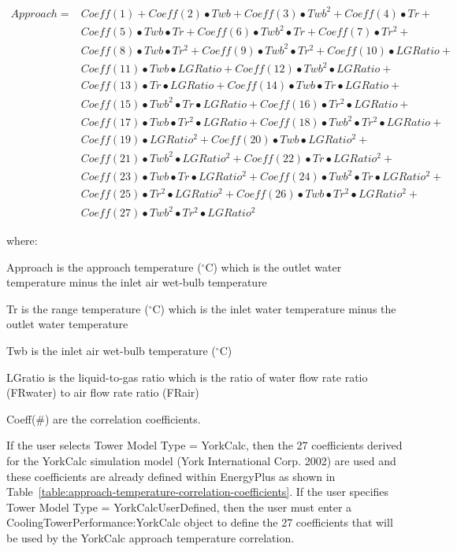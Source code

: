 \begin{equation}
\begin{array}{rl}
Approach =& Coeff(1) + Coeff(2)•Twb + Coeff(3)•Twb^{2} + Coeff(4)•Tr + \\
 & Coeff(5)•Twb•Tr + Coeff(6)•Twb^{2}•Tr + Coeff(7)•Tr^{2} + \\
 & Coeff(8)•Twb•Tr^{2} + Coeff(9)•Twb^{2}•Tr^{2} + Coeff(10)•LGRatio + \\
 & Coeff(11)•Twb•LGRatio + Coeff(12)•Twb^{2}•LGRatio + \\
 & Coeff(13)•Tr•LGRatio + Coeff(14)•Twb•Tr•LGRatio + \\
 & Coeff(15)•Twb^{2}•Tr•LGRatio + Coeff(16)•Tr^{2}•LGRatio + \\
 & Coeff(17)•Twb•Tr^{2}•LGRatio + Coeff(18)•Twb^{2}•Tr^{2}•LGRatio + \\
 & Coeff(19)•LGRatio^{2} + Coeff(20)•Twb•LGRatio^{2} + \\
 & Coeff(21)• Twb^{2}•LGRatio^{2} + Coeff(22)•Tr•LGRatio^{2} + \\
 & Coeff(23)•Twb•Tr•LGRatio^{2} + Coeff(24)•Twb^{2}•Tr•LGRatio^{2} + \\
 & Coeff(25)•Tr^{2}•LGRatio^{2} + Coeff(26)•Twb•Tr^{2}•LGRatio^{2} + \\
 & Coeff(27)•Twb^{2}•Tr^{2}•LGRatio^{2}
\end{array}
\end{equation}

where:

Approach is the approach temperature (\(^{\circ}\)C) which is the outlet water temperature minus the inlet air wet-bulb temperature

Tr is the range temperature (\(^{\circ}\)C) which is the inlet water temperature minus the outlet water temperature

Twb is the inlet air wet-bulb temperature (\(^{\circ}\)C)

LGratio is the liquid-to-gas ratio which is the ratio of water flow rate ratio (FRwater) to air flow rate ratio (FRair)

Coeff(\#) are the correlation coefficients.

If the user selects Tower Model Type = YorkCalc, then the 27 coefficients derived for the YorkCalc simulation model (York International Corp. 2002) are used and these coefficients are already defined within EnergyPlus as shown in Table~\ref{table:approach-temperature-correlation-coefficients}. If the user specifies Tower Model Type = YorkCalcUserDefined, then the user must enter a CoolingTowerPerformance:YorkCalc object to define the 27 coefficients that will be used by the YorkCalc approach temperature correlation.

